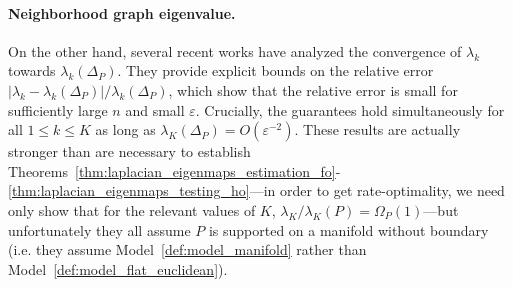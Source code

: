 \documentclass{article}
\newcommand{\1}{\mathbf{1}}
\theoremstyle{alden}
\theoremstyle{aldenthm}
\theoremstyle{definition}
\theoremstyle{remark}
\begin{document}


\paragraph{Neighborhood graph eigenvalue.}
On the other hand, several recent works \citep{burago2014,garciatrillos18,calder2019} have analyzed the convergence of $\lambda_{k}$ towards $\lambda_{k}(\Delta_P)$. They provide explicit bounds on the relative error $|\lambda_{k} - \lambda_{k}(\Delta_P)|/\lambda_{k}(\Delta_P)$, which show that the relative error is small for sufficiently large $n$ and small $\varepsilon$. Crucially, the guarantees hold simultaneously for all $1 \leq k \leq K$ as long as $\lambda_{K}(\Delta_P) = O(\varepsilon^{-2})$. These results are actually stronger than are necessary to establish Theorems~\ref{thm:laplacian_eigenmaps_estimation_fo}-\ref{thm:laplacian_eigenmaps_testing_ho}---in order to get rate-optimality, we need only show that for the relevant values of $K$, $\lambda_{K}/\lambda_K(P) = \Omega_P(1)$---but unfortunately they all assume $P$ is supported on a manifold without boundary (i.e. they assume Model~\ref{def:model_manifold} rather than Model~\ref{def:model_flat_euclidean}). 
\end{document}

